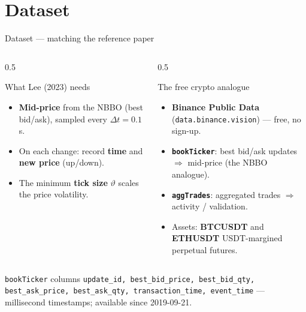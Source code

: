 \documentclass[aspectratio=169]{beamer}
\begin{document}
\section{Dataset}
\begin{frame}{Dataset — matching the reference paper}
  \begin{columns}[T]
    \begin{column}{0.5\textwidth}
      \begin{block}{What Lee (2023) needs}
        \begin{itemize}\footnotesize
          \item \textbf{Mid-price} from the NBBO (best bid/ask), sampled every $\Delta t=0.1$\,s.
          \item On each change: record \textbf{time} and \textbf{new price} (up/down).
          \item The minimum \textbf{tick size} $\vartheta$ scales the price volatility.
        \end{itemize}
      \end{block}
    \end{column}
    \begin{column}{0.5\textwidth}
      \begin{block}{The free crypto analogue}
        \begin{itemize}\footnotesize
          \item \textbf{Binance Public Data} (\texttt{data.binance.vision}) — free, no sign-up.
          \item \textbf{\texttt{bookTicker}}: best bid/ask updates $\Rightarrow$ mid-price (the NBBO analogue).
          \item \textbf{\texttt{aggTrades}}: aggregated trades $\Rightarrow$ activity / validation.
          \item Assets: \textbf{BTCUSDT} and \textbf{ETHUSDT} USDT-margined perpetual futures.
        \end{itemize}
      \end{block}
    \end{column}
  \end{columns}
  \begin{alertblock}{\texttt{bookTicker} columns}
    \scriptsize \texttt{update\_id, best\_bid\_price, best\_bid\_qty, best\_ask\_price, best\_ask\_qty, transaction\_time, event\_time} — millisecond timestamps; available since 2019-09-21.
  \end{alertblock}
\end{frame}
\end{document}
